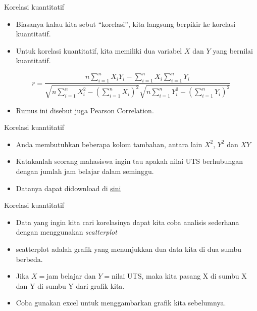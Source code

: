 \documentclass[
  ignorenonframetext,
]{beamer}
\providecommand{\tightlist}{%
  \setlength{\itemsep}{0pt}\setlength{\parskip}{0pt}}\usepackage{longtable,booktabs,array}
\begin{document}
\begin{frame}{Korelasi kuantitatif}
\label{korelasi-kuantitatif}
\begin{itemize}
\item
  Biasanya kalau kita sebut ``korelasi'', kita langsung berpikir ke
  korelasi kuantitatif.
\item
  Untuk korelasi kuantitatif, kita memiliki dua variabel \(X\) dan \(Y\)
  yang bernilai kuantitatif.
\end{itemize}

\[
r=\frac{n\sum_{i=1}^{n}X_iY_i-\sum_{i=1}^{n}X_i\sum_{i=1}^{n}Y_i}{\sqrt{n\sum_{i=1}^{n}X_i^2-\left(\sum_{i=1}^{n}X_i\right)^2} \sqrt{n\sum_{i=1}^{n}Y_i^2-\left(\sum_{i=1}^{n}Y_i\right)^2}}
\]

\begin{itemize}
\tightlist
\item
  Rumus ini disebut juga Pearson Correlation.
\end{itemize}
\end{frame}

\begin{frame}{Korelasi kuantitatif}
\label{korelasi-kuantitatif-1}
\begin{itemize}
\item
  Anda membutuhkan beberapa kolom tambahan, antara lain \(X^2\), \(Y^2\)
  dan \(XY\)
\item
  Katakanlah seorang mahasiswa ingin tau apakah nilai UTS berhubungan
  dengan jumlah jam belajar dalam seminggu.
\item
  Datanya dapat didownload di
  \href{https://docs.google.com/spreadsheets/d/16ZuQPD1sk76pv6sRpvjiiZcSP68CNPRq/edit?usp=drive_link&ouid=117760147588370390523&rtpof=true&sd=true}{sini}
\end{itemize}
\end{frame}

\begin{frame}{Korelasi kuantitatif}
\label{korelasi-kuantitatif-2}
\begin{itemize}
\item
  Data yang ingin kita cari korelasinya dapat kita coba analisis
  sederhana dengan menggunakan \emph{scatterplot}
\item
  scatterplot adalah grafik yang menunjukkan dua data kita di dua sumbu
  berbeda.
\item
  Jika \(X=\)jam belajar dan \(Y=\)nilai UTS, maka kita pasang X di
  sumbu X dan Y di sumbu Y dari grafik kita.
\item
  Coba gunakan excel untuk menggambarkan grafik kita sebelumnya.
\end{itemize}
\end{frame}
\end{document}
